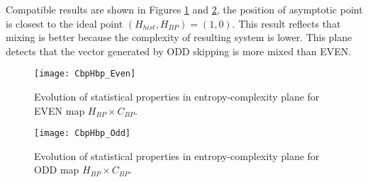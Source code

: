 Compatible results are shown in Figures \ref{fig:EVEN_HC} and \ref{fig:ODD_HC}, the position of asymptotic point is closest to the ideal point $(H_{hist}, H_{BP})=(1, 0)$.
This result reflects that mixing is better because the complexity of resulting system is lower.
This plane detects that the vector generated by ODD skipping is more mixed than EVEN.
%
\begin{figure}[H]
	\centering
	\texttt{[image: CbpHbp\_Even]}
	\caption{Evolution of statistical properties in entropy-complexity plane for EVEN map $H_{BP} \times C_{BP}$.}
	\label{fig:EVEN_HC}
\end{figure}
%
\begin{figure}[H]
	\centering
	\texttt{[image: CbpHbp\_Odd]}
	\caption{Evolution of statistical properties in entropy-complexity plane for ODD map $H_{BP} \times C_{BP}$.}
	\label{fig:ODD_HC}
\end{figure}
